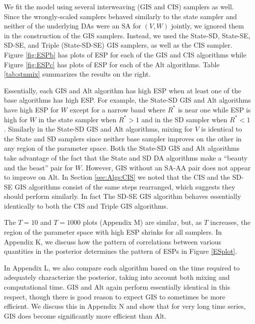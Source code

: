 \documentclass[12pt]{article}
\begin{document}
We fit the model using several interweaving (GIS and CIS) samplers as well. Since the wrongly-scaled samplers behaved similarly to the state sampler and neither of the underlying DAs were an SA for $(V,W)$ jointly, we ignored them in the construction of the GIS samplers. Instead, we used the State-SD, State-SE, SD-SE, and Triple (State-SD-SE) GIS samplers, as well as the CIS sampler. Figure \ref{fig:ESPb} has plots of ESP for each of the GIS and CIS algorithms while Figure \ref{fig:ESPc} has plots of ESP for each of the Alt algorithms. Table \ref{tab:stnmix} summarizes the results on the right. 

Essentially, each GIS and Alt algorithm has high ESP when at least one of the base algorithms has high ESP. For example, the State-SD GIS and Alt algorithms have high ESP for $W$ except for a narrow band where $R^*$ is near one while ESP is high for $W$ in the state sampler when $R^*>1$ and in the SD sampler when $R^*<1$. Similarly in the State-SD GIS and Alt algorithms, mixing for $V$ is identical to the State and SD samplers since neither base sampler improves on the other in any region of the parameter space. Both the State-SD GIS and Alt algorithms take advantage of the fact that the State and SD DA algorithms make a ``beauty and the beast'' pair for $W$. However, GIS without an SA-AA pair does not appear to improve on Alt. In Section \ref{sec:Algs:CIS} we noted that the CIS and the SD-SE GIS algorithms consist of the same steps rearranged, which suggests they should perform similarly. In fact The SD-SE GIS algorithm behaves essentially identically to both the CIS and Triple GIS algorithms. 

The $T=10$ and $T=1000$ plots (Appendix M) are similar, but, as $T$ increases, the region of the parameter space with high ESP shrinks for all samplers. In Appendix K, we discuss how the pattern of correlations between various quantities in the posterior determines the pattern of ESPs in Figure \ref{ESplot}. 

In Appendix L, we also compare each algorithm based on the time required to adequately characterize the posterior, taking into account both mixing and computational time. GIS and Alt again perform essentially identical in this respect, though there is good reason to expect GIS to sometimes be more efficient. We discuss this in Appendix N and show that for very long time series, GIS does become significantly more efficient than Alt.
\end{document}
